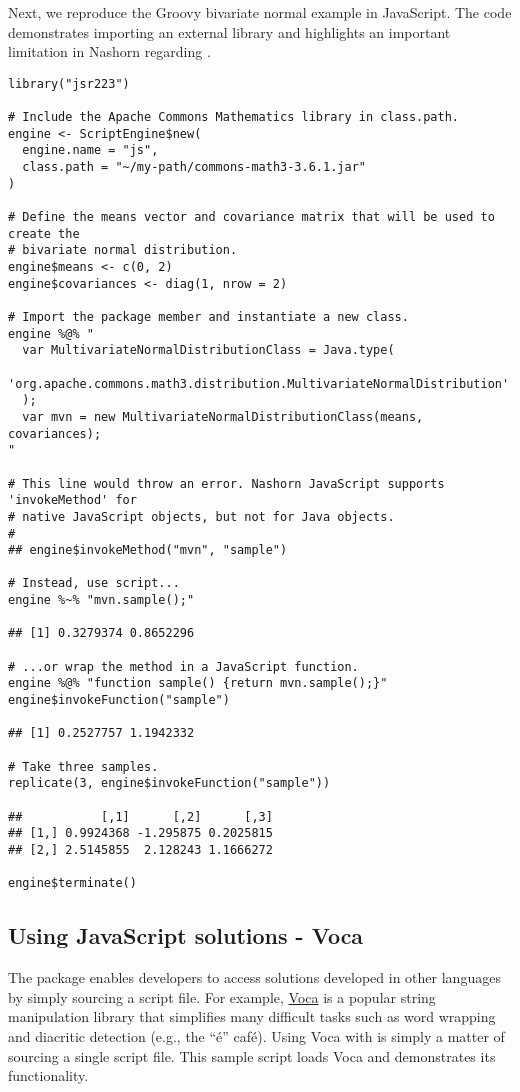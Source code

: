 Next, we reproduce the Groovy bivariate normal example in JavaScript. The code demonstrates importing an external library and highlights an important limitation in Nashorn regarding .

\begin{verbatim}
library("jsr223")

# Include the Apache Commons Mathematics library in class.path.
engine <- ScriptEngine$new(
  engine.name = "js",
  class.path = "~/my-path/commons-math3-3.6.1.jar"
)

# Define the means vector and covariance matrix that will be used to create the
# bivariate normal distribution.
engine$means <- c(0, 2)
engine$covariances <- diag(1, nrow = 2)

# Import the package member and instantiate a new class.
engine %@% "
  var MultivariateNormalDistributionClass = Java.type(
    'org.apache.commons.math3.distribution.MultivariateNormalDistribution'
  );
  var mvn = new MultivariateNormalDistributionClass(means, covariances);
"

# This line would throw an error. Nashorn JavaScript supports 'invokeMethod' for
# native JavaScript objects, but not for Java objects.
#
## engine$invokeMethod("mvn", "sample")

# Instead, use script...
engine %~% "mvn.sample();"

## [1] 0.3279374 0.8652296

# ...or wrap the method in a JavaScript function.
engine %@% "function sample() {return mvn.sample();}"
engine$invokeFunction("sample")

## [1] 0.2527757 1.1942332

# Take three samples.
replicate(3, engine$invokeFunction("sample"))

##           [,1]      [,2]      [,3]
## [1,] 0.9924368 -1.295875 0.2025815
## [2,] 2.5145855  2.128243 1.1666272

engine$terminate()
\end{verbatim}

\subsection{Using JavaScript solutions - Voca}

The  package enables developers to access solutions developed in other languages by simply sourcing a script file. For example, \href{https://vocajs.com/}{Voca} is a popular string manipulation library that simplifies many difficult tasks such as word wrapping and diacritic detection (e.g., the “\'{e}” caf\'{e}). Using Voca with  is simply a matter of sourcing a single script file. This sample script loads Voca and demonstrates its functionality.

